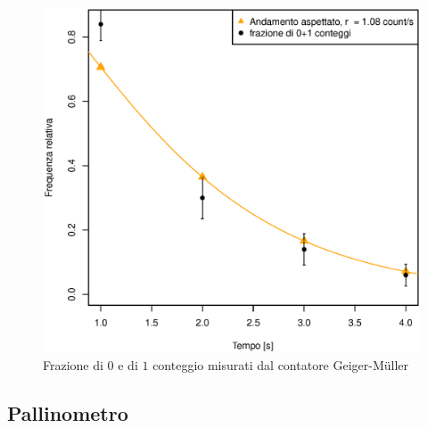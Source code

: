 \documentclass[10pt,oneside,a4paper]{article}
\begin{document}
\begin{figure}[H]
\caption{Frazione di $0$ e di $1$ conteggio misurati dal contatore Geiger-Müller}
\label{fig:0+1conteggi}
\centering
\includegraphics[scale=0.7]{0+1.eps}
\end{figure}

\pagebreak
\subsection{Pallinometro}
\end{document}
